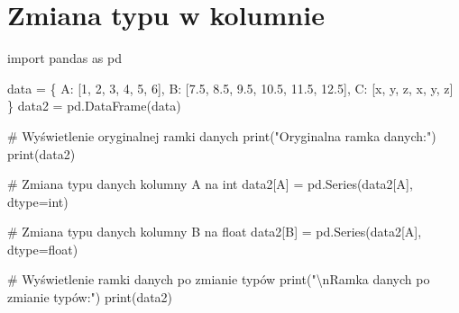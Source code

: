 \documentclass[
  polish,
  letterpaper,
  DIV=11,
  numbers=noendperiod]{scrreprt}
\newenvironment{Shaded}{\begin{snugshade}}{\end{snugshade}}
\newcommand{\BuiltInTok}[1]{\textcolor[rgb]{0.00,0.23,0.31}{#1}}
\newcommand{\CharTok}[1]{\textcolor[rgb]{0.13,0.47,0.30}{#1}}
\newcommand{\CommentTok}[1]{\textcolor[rgb]{0.37,0.37,0.37}{#1}}
\newcommand{\ImportTok}[1]{\textcolor[rgb]{0.00,0.46,0.62}{#1}}
\newcommand{\NormalTok}[1]{\textcolor[rgb]{0.00,0.23,0.31}{#1}}
\newcommand{\OperatorTok}[1]{\textcolor[rgb]{0.37,0.37,0.37}{#1}}
\newcommand{\StringTok}[1]{\textcolor[rgb]{0.13,0.47,0.30}{#1}}
\begin{document}
\section{Zmiana typu w kolumnie}\label{zmiana-typu-w-kolumnie}

\begin{Shaded}
\begin{Highlighting}[]
\ImportTok{import}\NormalTok{ pandas }\ImportTok{as}\NormalTok{ pd}


\NormalTok{data }\OperatorTok{=}\NormalTok{ \{}
    \StringTok{\textquotesingle{}A\textquotesingle{}}\NormalTok{: [}\StringTok{\textquotesingle{}1\textquotesingle{}}\NormalTok{, }\StringTok{\textquotesingle{}2\textquotesingle{}}\NormalTok{, }\StringTok{\textquotesingle{}3\textquotesingle{}}\NormalTok{, }\StringTok{\textquotesingle{}4\textquotesingle{}}\NormalTok{, }\StringTok{\textquotesingle{}5\textquotesingle{}}\NormalTok{, }\StringTok{\textquotesingle{}6\textquotesingle{}}\NormalTok{],}
    \StringTok{\textquotesingle{}B\textquotesingle{}}\NormalTok{: [}\StringTok{\textquotesingle{}7.5\textquotesingle{}}\NormalTok{, }\StringTok{\textquotesingle{}8.5\textquotesingle{}}\NormalTok{, }\StringTok{\textquotesingle{}9.5\textquotesingle{}}\NormalTok{, }\StringTok{\textquotesingle{}10.5\textquotesingle{}}\NormalTok{, }\StringTok{\textquotesingle{}11.5\textquotesingle{}}\NormalTok{, }\StringTok{\textquotesingle{}12.5\textquotesingle{}}\NormalTok{],}
    \StringTok{\textquotesingle{}C\textquotesingle{}}\NormalTok{: [}\StringTok{\textquotesingle{}x\textquotesingle{}}\NormalTok{, }\StringTok{\textquotesingle{}y\textquotesingle{}}\NormalTok{, }\StringTok{\textquotesingle{}z\textquotesingle{}}\NormalTok{, }\StringTok{\textquotesingle{}x\textquotesingle{}}\NormalTok{, }\StringTok{\textquotesingle{}y\textquotesingle{}}\NormalTok{, }\StringTok{\textquotesingle{}z\textquotesingle{}}\NormalTok{]}
\NormalTok{\}}
\NormalTok{data2 }\OperatorTok{=}\NormalTok{ pd.DataFrame(data)}

\CommentTok{\# Wyświetlenie oryginalnej ramki danych}
\BuiltInTok{print}\NormalTok{(}\StringTok{"Oryginalna ramka danych:"}\NormalTok{)}
\BuiltInTok{print}\NormalTok{(data2)}

\CommentTok{\# Zmiana typu danych kolumny \textquotesingle{}A\textquotesingle{} na int}
\NormalTok{data2[}\StringTok{\textquotesingle{}A\textquotesingle{}}\NormalTok{] }\OperatorTok{=}\NormalTok{ pd.Series(data2[}\StringTok{\textquotesingle{}A\textquotesingle{}}\NormalTok{], dtype}\OperatorTok{=}\BuiltInTok{int}\NormalTok{)}

\CommentTok{\# Zmiana typu danych kolumny \textquotesingle{}B\textquotesingle{} na float}
\NormalTok{data2[}\StringTok{\textquotesingle{}B\textquotesingle{}}\NormalTok{] }\OperatorTok{=}\NormalTok{ pd.Series(data2[}\StringTok{\textquotesingle{}A\textquotesingle{}}\NormalTok{], dtype}\OperatorTok{=}\BuiltInTok{float}\NormalTok{)}

\CommentTok{\# Wyświetlenie ramki danych po zmianie typów}
\BuiltInTok{print}\NormalTok{(}\StringTok{"}\CharTok{\textbackslash{}n}\StringTok{Ramka danych po zmianie typów:"}\NormalTok{)}
\BuiltInTok{print}\NormalTok{(data2)}
\end{Highlighting}
\end{Shaded}
\end{document}
